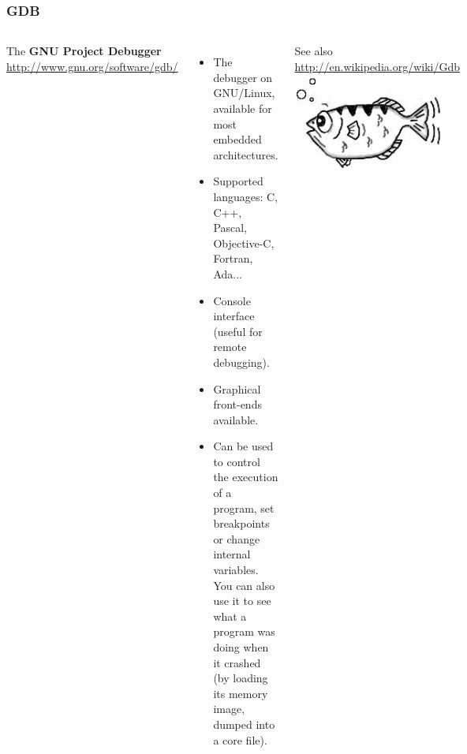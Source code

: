 \begin{frame}
  \frametitle{GDB}
  \begin{columns}[T]
    The {\bf GNU Project Debugger}\\
    \url{http://www.gnu.org/software/gdb/}
    \begin{itemize}
    \item The debugger on GNU/Linux, available for most embedded
      architectures.
    \item Supported languages: C, C++, Pascal, Objective-C, Fortran,
      Ada...
    \item Console interface (useful for remote debugging).
    \item Graphical front-ends available.
    \item Can be used to control the execution of a program, set
      breakpoints or change internal variables. You can also use it to
      see what a program was doing when it crashed (by loading its
      memory image, dumped into a core file).
    \end{itemize}
    See also \url{http://en.wikipedia.org/wiki/Gdb}
    \includegraphics[width=0.9\textwidth]{slides/sysdev-application-development/gdb.png}
  \end{columns}
\end{frame}

